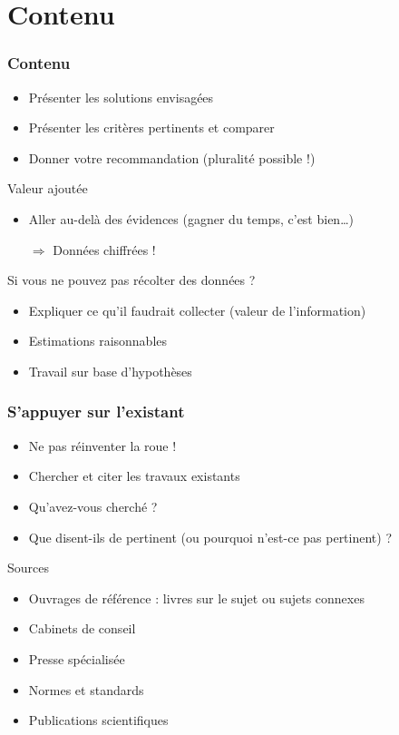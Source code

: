 \documentclass[french]{beamer}
\begin{document}
\section{Contenu}

\begin{frame}
	\frametitle{Contenu}
	\begin{itemize}
		\item Présenter les solutions envisagées
		\item Présenter les critères pertinents et comparer
		\item Donner votre recommandation (pluralité possible !)
	\end{itemize}
	\begin{block}{Valeur ajoutée}
				\begin{itemize}
					\item Aller au-delà des évidences (gagner du temps, c’est bien…)
					\item[$\Rightarrow$] Données \alert{chiffrées} !
				\end{itemize}
	\end{block}
	Si vous ne pouvez pas récolter des données ?
	\begin{itemize}
		\item Expliquer ce qu’il faudrait collecter (valeur de l’information)
		\item Estimations raisonnables
		\item Travail sur base d’hypothèses
	\end{itemize}
\end{frame}

\begin{frame}
	\frametitle{S’appuyer sur l’existant}
	\begin{itemize}
		\item Ne pas réinventer la roue !
		\item Chercher et citer les travaux existants
		\item Qu’avez-vous cherché ?
		\item Que disent-ils de pertinent (ou pourquoi n’est-ce pas pertinent) ?
	\end{itemize}
	\begin{block}{Sources}
		\begin{itemize}
			\item Ouvrages de référence : livres sur le sujet ou sujets connexes
			\item Cabinets de conseil
			\item Presse spécialisée
			\item Normes et standards
			\item Publications scientifiques
		\end{itemize}
	\end{block}
\end{frame}
\end{document}
